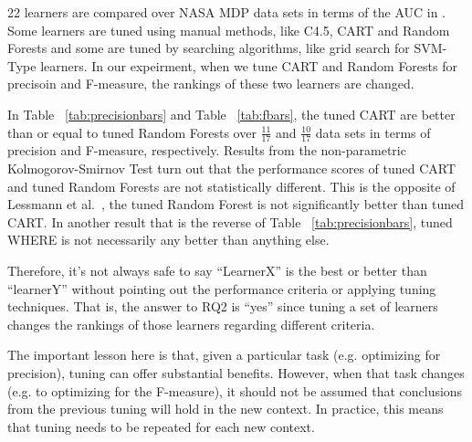 \documentclass{sig-alternative}
\newcommand{\tab}[1]{Table ~\ref{tab:#1}}
\begin{document}
22 learners are compared over NASA MDP data sets in terms of the AUC in \cite{lessmann2008benchmarking}. Some learners are tuned using manual methods, like C4.5, CART and Random Forests and some are tuned by searching algorithms, like grid search for SVM-Type learners. In our expeirment, when we tune CART and Random Forests for precisoin and F-measure, the rankings of these two learners are changed.

In \tab{precisionbars} and \tab{fbars}, the tuned CART are better than or equal to tuned Random Forests over $\frac{11}{17}$ and $\frac{10}{17}$ data sets in
terms of precision and F-measure, respectively. Results from the non-parametric Kolmogorov-Smirnov Test turn out that the performance 
scores of tuned CART and tuned Random Forests are not statistically different. This is the opposite of   
 Lessmann et al.~\cite{lessmann2008benchmarking}, the tuned Random Forest is not significantly better than tuned CART.
 In another result that is the reverse of \tab{precisionbars}, tuned WHERE is not necessarily
 any better than anything else.
 
 Therefore, it's not always safe to say ``LearnerX'' is the best or better than ``learnerY'' without pointing out the performance criteria or applying tuning techniques. That is, the answer to RQ2 is ``yes'' since tuning a set of learners
 changes the rankings of those learners regarding different criteria.
 
The  important lesson here is that, given a particular task (e.g. optimizing for precision), tuning can offer
substantial benefits. However, when that task changes (e.g. to optimizing for the F-measure),
it should not be assumed that conclusions from the previous tuning will hold in the new context.
In practice, this means that tuning needs to be repeated for each new context.
\end{document}

